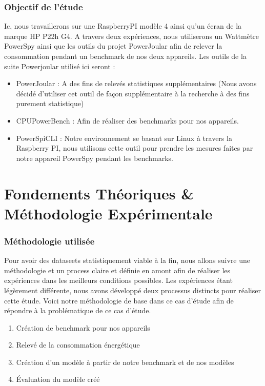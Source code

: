 \documentclass[12pt, a4paper]{report}
\begin{document}
\subsection{Objectif de l'étude}
Ic, nous travaillerons sur une RaspberryPI modèle 4 ainsi qu'un écran de la marque HP P22h G4. A travers deux expériences, nous utiliserons un Wattmètre PowerSpy ainsi que les outils du projet PowerJoular afin de relever la consommation pendant un benchmark de nos deux appareils.
Les outils de la suite Powerjoular utilisé ici seront :
\begin{itemize}
    \item PowerJoular : A des fins de relevés statistiques supplémentaires (Nous avons décidé d'utiliser cet outil de façon supplémentaire à la recherche à des fins purement statistique)
    \item CPUPowerBench : Afin de réaliser des benchmarks pour nos appareils.
    \item PowerSpiCLI : Notre environnement se basant sur Linux à travers la Raspberry PI, nous utilisons cette outil pour prendre les mesures faites par notre appareil PowerSpy pendant les benchmarks.
\end{itemize}

\chapter{\centering Fondements Théoriques \& Méthodologie Expérimentale}

\subsection{Méthodologie utilisée}
Pour avoir des dataseets statistiquement viable à la fin, nous allons suivre une méthodologie et un process claire et définie en amont afin de réaliser les expériences dans les meilleurs conditions possibles. Les expériences étant légèrement différente, nous avons développé deux processus distincts pour réaliser cette étude.
Voici notre méthodologie de base dans ce cas d'étude afin de répondre à la problématique de ce cas d'étude.
\begin{enumerate}
    \item Création de benchmark pour nos appareils
    \item Relevé de la consommation énergétique
    \item Création d'un modèle à partir de notre benchmark et de nos modèles
    \item Évaluation du modèle créé
\end{enumerate}
\end{document}
